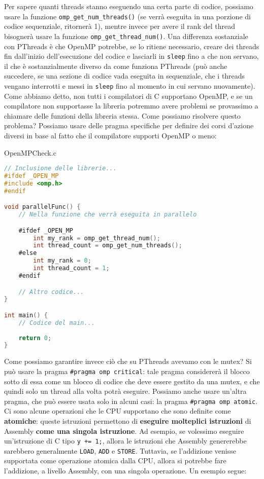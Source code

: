Per sapere quanti threads stanno eseguendo una certa parte di codice, possiamo usare la funzione \verb|omp_get_num_threads()| (se verrà eseguita in una porzione di codice sequenziale, ritornerà 1), mentre invece per avere il rank del thread bisognerà usare la funzione \verb|omp_get_thread_num()|.
\nwl
Una differenza sostanziale con PThreads è che OpenMP potrebbe, se lo ritiene necessario, creare dei threads fin dall'inizio dell'esecuzione del codice e lasciarli in \verb|sleep| fino a che non servano, il che è sostanzialmente diverso da come funziona PThreads (può anche succedere, se una sezione di codice vada eseguita in sequenziale, che i threads vengano interrotti e messi in \verb|sleep| fino al momento in cui servano nuovamente).
\nwl
Come abbiamo detto, non tutti i compilatori di C supportano OpenMP, e se un compilatore non supportasse la libreria potremmo avere problemi se provassimo a chiamare delle funzioni della libreria stessa. Come possiamo risolvere questo problema? Possiamo usare delle pragma specifiche per definire dei corsi d'azione diversi in base al fatto che il compilatore supporti OpenMP o meno:
\pagebreak
\begin{codeblock}{OpenMPCheck.c}
    \begin{lstlisting}[language = C]
// Inclusione delle librerie...
#ifdef _OPEN_MP
#include <omp.h>
#endif

void parallelFunc() {
    // Nella funzione che verrà eseguita in parallelo

    #ifdef _OPEN_MP
        int my_rank = omp_get_thread_num();
        int thread_count = omp_get_num_threads();
    #else
        int my_rank = 0;
        int thread_count = 1;
    #endif

    // Altro codice...
}

int main() {
    // Codice del main...
    
    return 0;
}\end{lstlisting}
\end{codeblock}

Come possiamo garantire invece ciò che su PThreads avevamo con le mutex? Si può usare la pragma \verb|#pragma omp critical|: tale pragma considererà il blocco sotto di essa come un blocco di codice che deve essere gestito da una mutex, e che quindi solo un thread alla volta potrà eseguire.
\nwl
Possiamo anche usare un'altra pragma, che può essere usata solo in alcuni casi: la pragma \verb|#pragma omp atomic|. Ci sono alcune operazioni che le CPU supportano che sono definite come \textbf{atomiche}: queste istruzioni permettono di \textbf{eseguire molteplici istruzioni} di Assembly \textbf{come una singola istruzione}. Ad esempio, se volessimo eseguire un'istruzione di C tipo \verb|y += 1;|, allora le istruzioni che Assembly genererebbe sarebbero generalmente \verb|LOAD|, \verb|ADD| e \verb|STORE|. Tuttavia, se l'addizione venisse supportata come operazione atomica dalla CPU, allora si potrebbe fare l'addizione, a livello Assembly, con una singola operazione. Un esempio segue:

